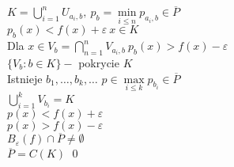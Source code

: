 $K = \bigcup\limits_{i=1}^n U_{a_i,b},\ p_b = \min\limits_{i \le n} p_{a_i,b} \in 
\overline P$ \\ 
$p_b (x) < f(x) + \varepsilon \ x \in K$ \\
Dla $x \in V_b = \bigcap\limits_{n=1}^n V_{a_i,b} \ p_b (x) > f(x) - \varepsilon$ \\ 
$\{V_b: b \in K\} - $ pokrycie $K$ \\ 
Istnieje $b_1,\ldots,b_k,\ldots$ $p \in \max\limits_{i \le k} p_{b_i} \in \overline P$ \\ 
$\bigcup\limits_{i = 1}^k V_{b_i} = K$ \\ 
$p(x) < f(x) + \varepsilon$ \\ 
$p(x) > f(x) - \varepsilon$ \\ 
$B_\varepsilon (f) \cap \overline P \neq \emptyset$ \\ 
$\overline P = C(K)$ \hfill \qed

